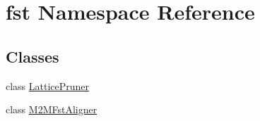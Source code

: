 \hypertarget{namespacefst}{}\section{fst Namespace Reference}
\label{namespacefst}
\subsection*{Classes}
\begin{DoxyCompactItemize}
\item 
class \hyperlink{classfst_1_1_lattice_pruner}{Lattice\+Pruner}
\item 
class \hyperlink{classfst_1_1_m2_m_fst_aligner}{M2\+M\+Fst\+Aligner}
\end{DoxyCompactItemize}
